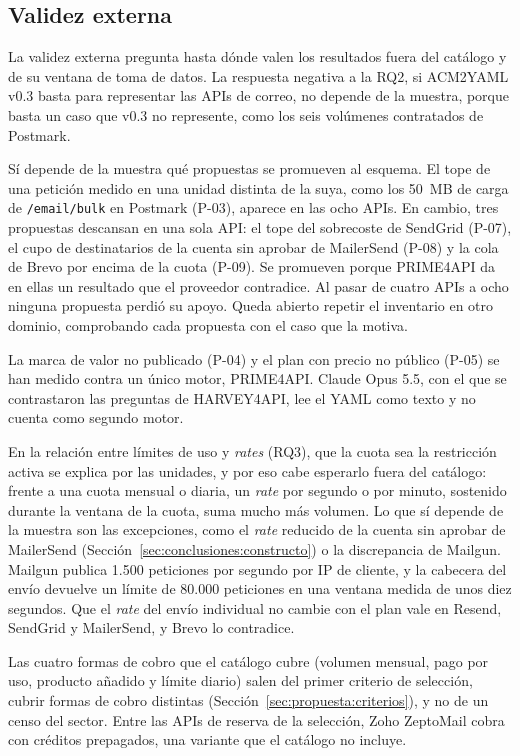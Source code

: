 \subsection{Validez externa}\label{sec:conclusiones:externa}

La validez externa pregunta hasta dónde valen los resultados fuera del catálogo y de su ventana de toma de datos.
La respuesta negativa a la RQ2, si ACM2YAML v0.3 basta para representar las APIs de correo, no depende de la muestra, porque basta un caso que v0.3 no represente, como los seis volúmenes contratados de Postmark.

Sí depende de la muestra qué propuestas se promueven al esquema.
El tope de una petición medido en una unidad distinta de la suya, como los 50~MB de carga de \texttt{/email/bulk} en Postmark (P-03), aparece en las ocho APIs.
En cambio, tres propuestas descansan en una sola API: el tope del sobrecoste de SendGrid (P-07), el cupo de destinatarios de la cuenta sin aprobar de MailerSend (P-08) y la cola de Brevo por encima de la cuota (P-09).
Se promueven porque PRIME4API da en ellas un resultado que el proveedor contradice.
Al pasar de cuatro APIs a ocho ninguna propuesta perdió su apoyo.
Queda abierto repetir el inventario en otro dominio, comprobando cada propuesta con el caso que la motiva.

La marca de valor no publicado (P-04) y el plan con precio no público (P-05) se han medido contra un único motor, PRIME4API.
Claude Opus 5.5, con el que se contrastaron las preguntas de HARVEY4API, lee el YAML como texto y no cuenta como segundo motor.

En la relación entre límites de uso y \textit{rates} (RQ3), que la cuota sea la restricción activa se explica por las unidades, y por eso cabe esperarlo fuera del catálogo: frente a una cuota mensual o diaria, un \textit{rate} por segundo o por minuto, sostenido durante la ventana de la cuota, suma mucho más volumen.
Lo que sí depende de la muestra son las excepciones, como el \textit{rate} reducido de la cuenta sin aprobar de MailerSend (Sección~\ref{sec:conclusiones:constructo}) o la discrepancia de Mailgun.
Mailgun publica 1.500 peticiones por segundo por IP de cliente, y la cabecera del envío devuelve un límite de 80.000 peticiones en una ventana medida de unos diez segundos.
Que el \textit{rate} del envío individual no cambie con el plan vale en Resend, SendGrid y MailerSend, y Brevo lo contradice.

Las cuatro formas de cobro que el catálogo cubre (volumen mensual, pago por uso, producto añadido y límite diario) salen del primer criterio de selección, cubrir formas de cobro distintas (Sección~\ref{sec:propuesta:criterios}), y no de un censo del sector.
Entre las APIs de reserva de la selección, Zoho ZeptoMail cobra con créditos prepagados, una variante que el catálogo no incluye.


